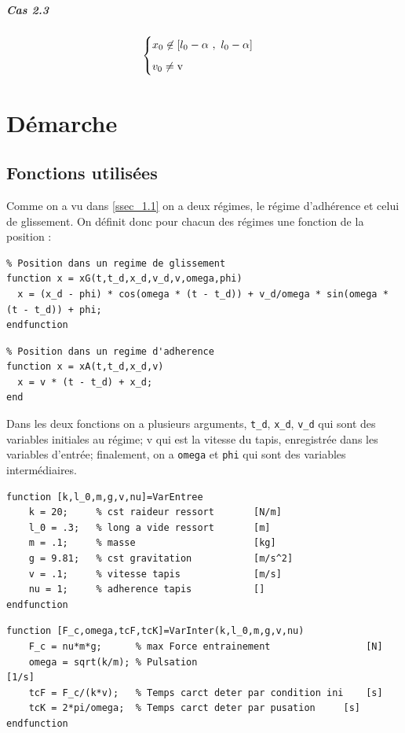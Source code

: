 \documentclass{article}
\begin{document}
\subparagraph{Cas 2.3} \label{spar_1.2.0.2.3}
$$
\begin{cases}
	\vspace{.2cm}
	x_0  \not\in [l_0-\alpha~,~l_0-\alpha]\\
	v_0 \neq \text{v}
\end{cases}
$$
\newpage
\section{Démarche}\label{sec_2}
\subsection{Fonctions utilisées}\label{ssec_2.1}
Comme on a vu dans \ref{ssec_1.1} on a deux régimes, le régime d'adhérence et celui de glissement. On définit donc pour chacun des régimes une fonction de la position : 

\begin{lstlisting}
% Position dans un regime de glissement
function x = xG(t,t_d,x_d,v_d,v,omega,phi)
  x = (x_d - phi) * cos(omega * (t - t_d)) + v_d/omega * sin(omega * (t - t_d)) + phi;
endfunction
\end{lstlisting}

\begin{lstlisting}
% Position dans un regime d'adherence
function x = xA(t,t_d,x_d,v)
  x = v * (t - t_d) + x_d;
end
\end{lstlisting}

Dans les deux fonctions on a plusieurs arguments, \verb|t_d|, \verb|x_d|, \verb|v_d| qui sont des variables initiales au régime; v qui est la vitesse du tapis, enregistrée dans les variables d'entrée; finalement, on a \verb|omega| et \verb|phi| qui sont des variables intermédiaires. \\
\begin{lstlisting}
function [k,l_0,m,g,v,nu]=VarEntree
	k = 20;		% cst raideur ressort    	[N/m]
	l_0 = .3;	% long a vide ressort    	[m]
	m = .1;		% masse                  	[kg]
	g = 9.81;	% cst gravitation        	[m/s^2]
	v = .1;		% vitesse tapis          	[m/s]
	nu = 1;		% adherence tapis        	[]
endfunction
\end{lstlisting}

\begin{lstlisting}
function [F_c,omega,tcF,tcK]=VarInter(k,l_0,m,g,v,nu)
	F_c = nu*m*g;      % max Force entrainement					[N]
	omega = sqrt(k/m); % Pulsation									[1/s]
	tcF = F_c/(k*v);   % Temps carct deter par condition ini	[s]
	tcK = 2*pi/omega;  % Temps carct deter par pusation		[s]
endfunction
\end{lstlisting}
\end{document}
